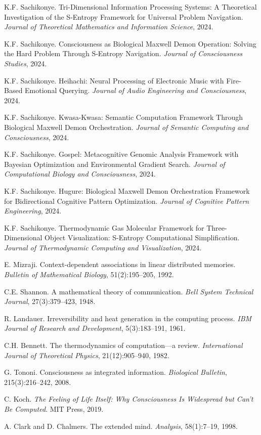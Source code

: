 \documentclass[12pt,a4paper]{article}
\begin{document}

\begin{thebibliography}{99}

K.F. Sachikonye.
Tri-Dimensional Information Processing Systems: A Theoretical Investigation of the S-Entropy Framework for Universal Problem Navigation.
\textit{Journal of Theoretical Mathematics and Information Science}, 2024.

K.F. Sachikonye.
Consciousness as Biological Maxwell Demon Operation: Solving the Hard Problem Through S-Entropy Navigation.
\textit{Journal of Consciousness Studies}, 2024.

K.F. Sachikonye.
Heihachi: Neural Processing of Electronic Music with Fire-Based Emotional Querying.
\textit{Journal of Audio Engineering and Consciousness}, 2024.

K.F. Sachikonye.
Kwasa-Kwasa: Semantic Computation Framework Through Biological Maxwell Demon Orchestration.
\textit{Journal of Semantic Computing and Consciousness}, 2024.

K.F. Sachikonye.
Gospel: Metacognitive Genomic Analysis Framework with Bayesian Optimization and Environmental Gradient Search.
\textit{Journal of Computational Biology and Consciousness}, 2024.

K.F. Sachikonye.
Hugure: Biological Maxwell Demon Orchestration Framework for Bidirectional Cognitive Pattern Optimization.
\textit{Journal of Cognitive Pattern Engineering}, 2024.

K.F. Sachikonye.
Thermodynamic Gas Molecular Framework for Three-Dimensional Object Visualization: S-Entropy Computational Simplification.
\textit{Journal of Thermodynamic Computing and Visualization}, 2024.

E. Mizraji.
Context-dependent associations in linear distributed memories.
\textit{Bulletin of Mathematical Biology}, 51(2):195--205, 1992.

C.E. Shannon.
A mathematical theory of communication.
\textit{Bell System Technical Journal}, 27(3):379--423, 1948.

R. Landauer.
Irreversibility and heat generation in the computing process.
\textit{IBM Journal of Research and Development}, 5(3):183--191, 1961.

C.H. Bennett.
The thermodynamics of computation—a review.
\textit{International Journal of Theoretical Physics}, 21(12):905--940, 1982.

G. Tononi.
Consciousness as integrated information.
\textit{Biological Bulletin}, 215(3):216--242, 2008.

C. Koch.
\textit{The Feeling of Life Itself: Why Consciousness Is Widespread but Can't Be Computed}.
MIT Press, 2019.

A. Clark and D. Chalmers.
The extended mind.
\textit{Analysis}, 58(1):7--19, 1998.

\end{thebibliography}
\end{document}
